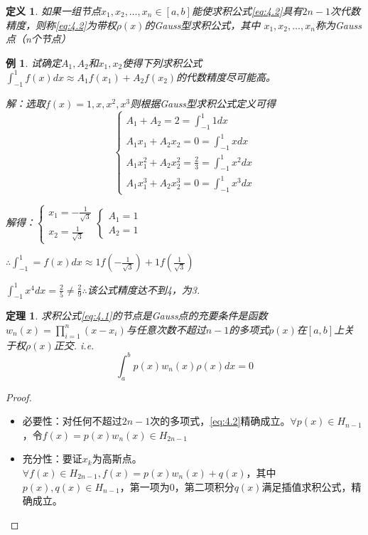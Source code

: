 \documentclass[a4paper]{article}
\newtheorem{definition}{定义}[section]
\newtheorem{theorem}{定理}[section]
\newtheorem{example}{例}[section]
\begin{document}
\begin{definition}
    如果一组节点$x_1, x_2, \dots, x_n \in [a,b]$能使求积公式\ref{eq:4.2}具有$2n-1$次代数精度，则称\ref{eq:4.2}为带权$\rho(x)$的Gauss型求积公式，其中
    $x_1, x_2, \dots, x_n$称为Gauss点（n个节点）
\end{definition}

\begin{example}
    试确定$A_1, A_2$和$x_1, x_2$使得下列求积公式$\int^1_{-1}f(x)dx\approx A_1f(x_1)+A_2f(x_2) $的代数精度尽可能高。
    
    解：选取$f(x)=1,x,x^2,x^3$则根据Gauss型求积公式定义可得
    \begin{equation*}
        \left\{
            \begin{array}{lr}
                A_1+A_2 = 2 = \int^1_{-1}1dx \\
                A_1x_1 + A_2x_2 = 0 = \int^1_{-1}xdx \\
                A_1x_1^2 + A_2x_2^2 = \frac{2}{3} = \int^1_{-1}x^2dx \\
                A_1x_1^3 + A_2x_2^3 = 0 = \int^1_{-1}x^3dx
            \end{array}
            \right.
    \end{equation*}

    解得：$\left\{\begin{array}{lr}
        x_1 = -\frac{1}{\sqrt{3}} \\
        x_2 = \frac{1}{\sqrt{3}}
    \end{array}\right. \left\{\begin{array}{lr}
        A_1 = 1 \\
        A_2 = 1
    \end{array}\right.$ 

    $\therefore \int^1_{-1}=f(x)dx \approx 1f(-\frac{1}{\sqrt{3}})+1f(\frac{1}{\sqrt{3}}) $

    $\int^1_{-1}x^4dx = \frac{2}{5} \neq \frac{2}{9} \therefore$该公式精度达不到4，为3.
\end{example}

\begin{theorem}
    求积公式\ref{eq:4.1}的节点是Gauss点的充要条件是函数$w_n(x)=\prod^n_{i=1}(x-x_i) $与任意次数不超过$n-1$的多项式$p(x)$在$[a,b]$上关于权$\rho(x)$正交.
    i.e. 
    $$
    \int^b_ap(x)w_n(x)\rho(x)dx = 0
    $$
\end{theorem}

\begin{proof}
    \begin{itemize}
        \item 必要性：对任何不超过$2n-1$次的多项式，\ref{eq:4.2}精确成立。$\forall p(x) \in H_{n-1}$，令$f(x)=p(x)w_{n}(x)\in H_{2n-1} $
        \item 充分性：要证$x_k$为高斯点。$\forall f(x)\in H_{2n-1}, f(x) = p(x)w_n(x)+q(x) $，其中$p(x), q(x)\in H_{n-1}$，第一项为0，第二项积分$q(x)$满足插值求积公式，精确成立。
    \end{itemize}
\end{proof}
\end{document}
